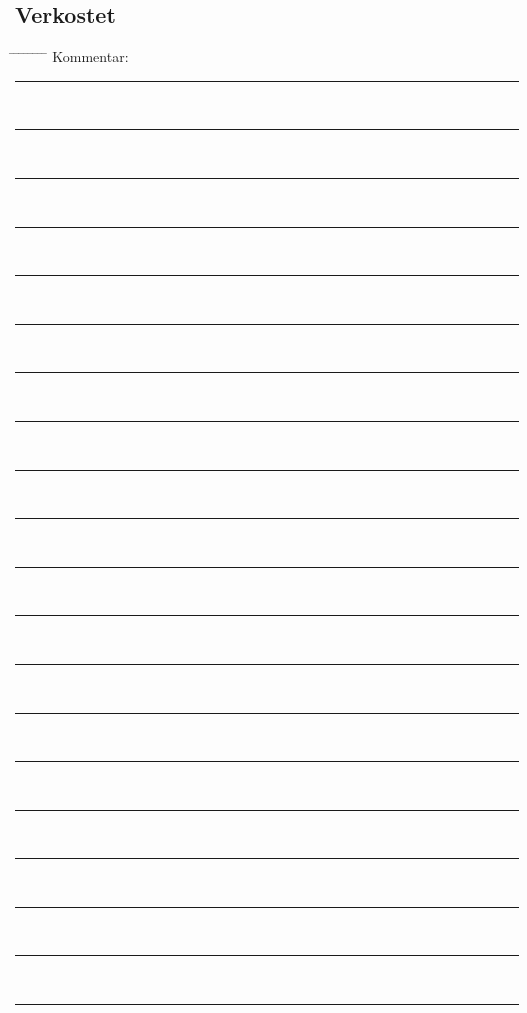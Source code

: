 \documentclass[12pt,oneside,a4paper]{scrartcl}
\begin{document}
\subsection*{Verkostet}
\begin{tabbing}
	\hspace{1cm} \= \hspace{1cm} \= \hspace{1cm} \= \hspace{1cm} \= \hspace{1cm} \= \hspace{1cm} \= \hspace{1cm} \= \hspace{1cm} \= \kill
	\> Kommentar: \>\>\> \rule[-0.2cm]{13cm}{1pt}\\
	\> \>  \rule[-0.2cm]{15.3cm}{1pt}\\
	\> \>  \rule[-0.2cm]{15.3cm}{1pt}\\
	\> \>  \rule[-0.2cm]{15.3cm}{1pt}\\		
	\> \>  \rule[-0.2cm]{15.3cm}{1pt}\\
	\> \>  \rule[-0.2cm]{15.3cm}{1pt}\\
	\> \>  \rule[-0.2cm]{15.3cm}{1pt}\\
	\> \>  \rule[-0.2cm]{15.3cm}{1pt}\\
	\> \>  \rule[-0.2cm]{15.3cm}{1pt}\\
	\> \>  \rule[-0.2cm]{15.3cm}{1pt}\\
	\> \>  \rule[-0.2cm]{15.3cm}{1pt}\\
	\> \>  \rule[-0.2cm]{15.3cm}{1pt}\\
	\> \>  \rule[-0.2cm]{15.3cm}{1pt}\\
	\> \>  \rule[-0.2cm]{15.3cm}{1pt}\\
	\> \>  \rule[-0.2cm]{15.3cm}{1pt}\\
	\> \>  \rule[-0.2cm]{15.3cm}{1pt}\\
	\> \>  \rule[-0.2cm]{15.3cm}{1pt}\\
	\> \>  \rule[-0.2cm]{15.3cm}{1pt}\\
	\> \>  \rule[-0.2cm]{15.3cm}{1pt}\\
	\> \>  \rule[-0.2cm]{15.3cm}{1pt}
\end{tabbing}
\end{document}

